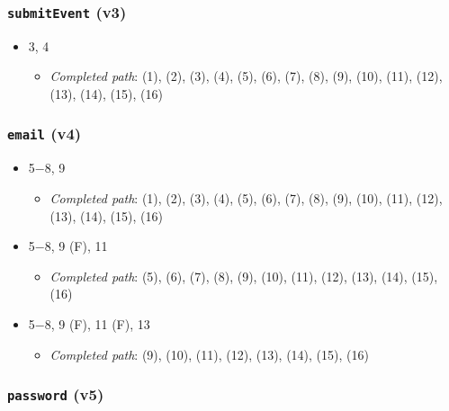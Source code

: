 \documentclass{article}
\newcommand{\completedpath}{\textit{Completed path}}
\begin{document}
\subsubsection*{\texttt{submitEvent} (v3)}

\begin{itemize}
    \item 3, 4
    \begin{itemize}
        \item \completedpath: (1), (2), (3), (4), (5), (6), (7), (8), (9), (10), (11), (12), (13), (14), (15), (16)
    \end{itemize}
\end{itemize}

\subsubsection*{\texttt{email} (v4)}

\begin{itemize}
    \item 5$-$8, 9
    \begin{itemize}
        \item \completedpath: (1), (2), (3), (4), (5), (6), (7), (8), (9), (10), (11), (12), (13), (14), (15), (16)
    \end{itemize}
    \item 5$-$8, 9 (F), 11
    \begin{itemize}
        \item \completedpath: (5), (6), (7), (8), (9), (10), (11), (12), (13), (14), (15), (16)
    \end{itemize}
    \item 5$-8$, 9 (F), 11 (F), 13
    \begin{itemize}
        \item \completedpath: (9), (10), (11), (12), (13), (14), (15), (16)
    \end{itemize}
\end{itemize}

\subsubsection*{\texttt{password} (v5)}
\end{document}
